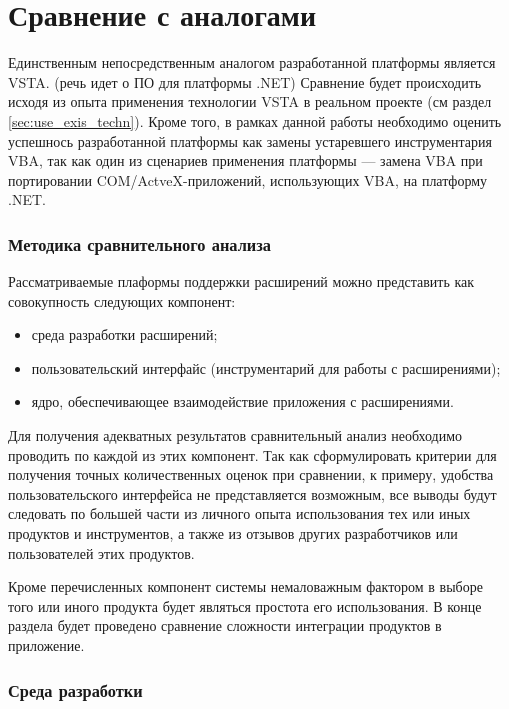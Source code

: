 \section{Сравнение с аналогами}
\label{sec:analogs-comparison}

Единственным непосредственным аналогом разработанной платформы является VSTA. (речь идет о ПО для платформы .NET)  Сравнение будет происходить исходя из опыта применения технологии VSTA в реальном проекте (см раздел \ref{sec:use_exis_techn}). Кроме того, в рамках данной работы необходимо оценить успешнось разработанной платформы как замены устаревшего инструментария VBA, так как один из сценариев применения платформы --- замена VBA при портировании COM/ActveX-приложений, использующих VBA, на платформу .NET.

\subsubsection{Методика сравнительного анализа}

Рассматриваемые плаформы поддержки расширений можно представить как совокупность следующих компонент:

\begin{itemize}
   \item среда разработки расширений;
   \item пользовательский интерфайс (инструментарий для работы с расширениями);
   \item ядро, обеспечивающее взаимодействие приложения с расширениями.
\end{itemize}

Для получения адекватных результатов сравнительный анализ необходимо проводить по каждой из этих компонент. Так как сформулировать критерии для получения точных количественных оценок при сравнении, к примеру, удобства пользовательского интерфейса не представляется возможным, все выводы будут следовать по большей части из личного опыта использования тех или иных продуктов и инструментов, а также из отзывов других разработчиков или пользователей этих продуктов.

Кроме перечисленных компонент системы немаловажным фактором в выборе того или иного продукта будет являться простота его использования. В конце раздела будет проведено сравнение сложности интеграции продуктов в приложение.

\subsubsection{Среда разработки}


